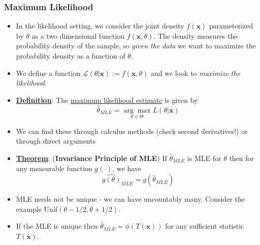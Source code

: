 \documentclass{article}
\newcommand{\x}{{\textbf{x}}}
\begin{document}
\subsubsection{Maximum Likelihood}
\begin{itemize}
\item In the likelihood setting, we consider the joint density $f(\x)$ parameterized by $\theta$ as a two dimensional function $f(\x,\theta)$. The density measures the probability density of the sample, so \textit{given the data} we want to maximize the probability density as a function of $\theta$.
\item We define a function $\mathcal{L}(\theta|\x) := f(\x,\theta)$ and we look to \textit{maximize the likelihood}.
\item \underline{\textbf{Definition}}: The \underline{maximum likelihood estimate} is given by $$\hat{\theta}_{MLE} = \underset{\theta\in\Theta}{\arg\max}L(\theta|\x)$$
\item We can find these through calculus methods (check second derivatives!) or through direct arguments
\item \underline{\textbf{Theorem}}: (\textbf{Invariance Principle of MLE}) If $\hat{\theta}_{MLE}$ is MLE for $\theta$ then for any measurable function $g(\cdot)$, we have $$\widehat{g(\theta)}_{MLE} = g(\hat{\theta}_{MLE})$$
\item MLE needs not be unique - we can have uncountably many. Consider the example Unif$(\theta - 1/2, \theta + 1/2)$.
\item If the MLE is unique then $\hat{\theta}_{MLE} = \phi(T(\x))$ for any sufficient statistic $T(\x)$. 
\end{itemize}
\end{document}
